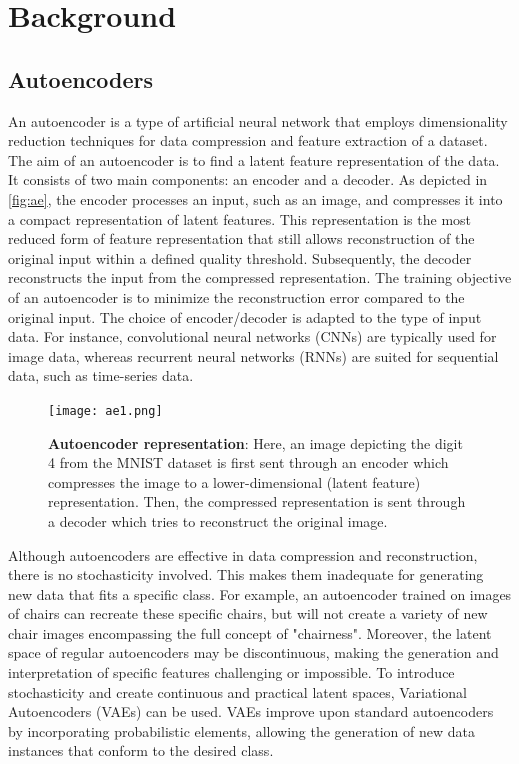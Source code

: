 \section{Background}\label{sec:Theory}

\subsection{Autoencoders}

An autoencoder is a type of artificial neural network that employs dimensionality reduction techniques for data compression and feature extraction of a dataset. The aim of an autoencoder is to find a latent feature representation of the data. It consists of two main components: an encoder and a decoder. As depicted in \autoref{fig:ae}, the encoder processes an input, such as an image, and compresses it into a compact representation of latent features. This representation is the most reduced form of feature representation that still allows reconstruction of the original input within a defined quality threshold. Subsequently, the decoder reconstructs the input from the compressed representation. The training objective of an autoencoder is to minimize the reconstruction error compared to the original input. The choice of encoder/decoder is adapted to the type of input data. For instance, convolutional neural networks (CNNs) are typically used for image data, whereas recurrent neural networks (RNNs) are suited for sequential data, such as time-series data. 

\begin{figure}[!htb]
 \centering
 \texttt{[image: ae1.png]}
 \caption{\textbf{Autoencoder representation}: Here, an image depicting the digit 4 from the MNIST dataset is first sent through an encoder which compresses the image to a lower-dimensional (latent feature) representation. Then, the compressed representation is sent through a decoder which tries to reconstruct the original image.}
 \label{fig:ae}
\end{figure}

Although autoencoders are effective in data compression and reconstruction, there is no stochasticity involved. This makes them inadequate for generating new data that fits a specific class. For example, an autoencoder trained on images of chairs can recreate these specific chairs, but will not create a variety of new chair images encompassing the full concept of "chairness". Moreover, the latent space of regular autoencoders may be discontinuous, making the generation and interpretation of specific features challenging or impossible. To introduce stochasticity and create continuous and practical latent spaces, Variational Autoencoders (VAEs) \citep{kingma2022autoencoding} can be used. VAEs improve upon standard autoencoders by incorporating probabilistic elements, allowing the generation of new data instances that conform to the desired class. 

